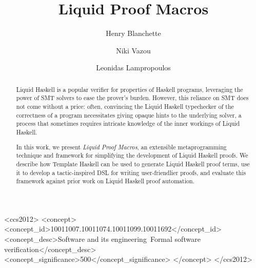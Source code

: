 \documentclass[sigplan,screen]{acmart}
\begin{document}
\title{Liquid Proof Macros}

\author{Henry Blanchette}

\author{Niki Vazou}

\author{Leonidas Lampropoulos}

\renewcommand{\shortauthors}{Blanchette et al.}

\begin{abstract}
Liquid Haskell is a popular verifier for properties of Haskell programs,
leveraging the power of SMT solvers to ease the prover's burden.
%
However, this reliance on SMT does not come without a price: often,
convincing the Liquid Haskell typechecker of the correctness of a
program necessitates giving opaque hints to the underlying solver, a
process that sometimes requires intricate knowledge of the inner workings
of Liquid Haskell.

In this work, we present {\em Liquid Proof Macros}, an extensible
metaprogramming technique and framework for simplifying the
development of Liquid Haskell proofs.
%
We describe how Template Haskell can be used to generate Liquid
Haskell proof terms, use it to develop a tactic-inspired DSL for
writing user-friendlier proofs, and evaluate this framework against
prior work on Liquid Haskell proof automation.
\end{abstract}

\begin{CCSXML}
<ccs2012>
   <concept>
       <concept_id>10011007.10011074.10011099.10011692</concept_id>
       <concept_desc>Software and its engineering~Formal software verification</concept_desc>
       <concept_significance>500</concept_significance>
       </concept>
 </ccs2012>
\end{CCSXML}
\end{document}
